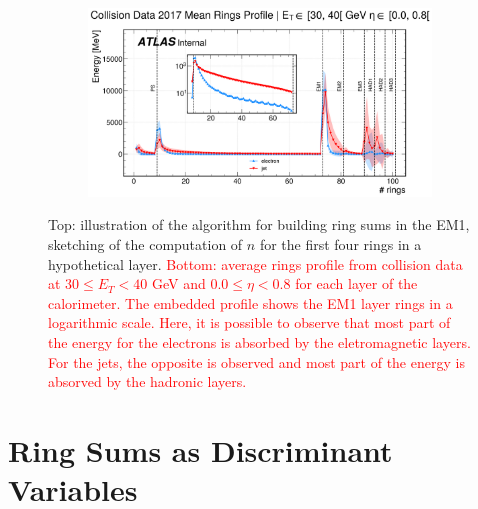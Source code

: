 \begin{figure}[!ht]
\begin{center}
  \begin{subfigure}[c]{.7\textwidth}
  \centering
  \includegraphics[width=1.1\textwidth]{sections/ringer/figures/reco_steps/data17_zee_mean_rings_profiles_et2_eta0.png}
  \caption{}
  \label{fig:building_rings_b}
  \end{subfigure}
  \caption{
  Top: illustration of the \fastcalo algorithm for building ring sums in the EM1, sketching of the computation of $n$ for the first four rings in a hypothetical layer.
  	\textcolor{red}{Bottom: average rings profile from collision data at $30 \leq E_T < 40$ GeV and $0.0 \leq \eta < 0.8$ for each layer of the calorimeter. The embedded profile shows the EM1 layer rings in a logarithmic scale. Here, it is possible to observe that most part of the energy for the electrons is absorbed by the eletromagnetic layers. For the jets, the opposite is observed and most part of the energy is absorved by the hadronic layers.}}
  \end{center}
\end{figure}





\section{Ring Sums as Discriminant Variables}\label{ssec:ringer_id}


